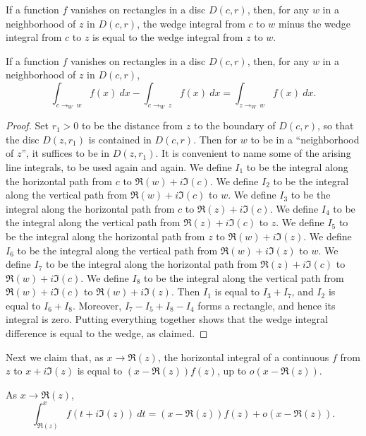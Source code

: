 If a function $f$ vanishes on rectangles in a disc $D(c,r)$, then, for any $w$ in a neighborhood
of $z$ in $D(c,r)$, the wedge integral from $c$ to $w$ minus the wedge integral from $c$ to $z$
is equal to the wedge integral from $z$ to $w$.
\begin{lemma}
  \label{diff_of_wedges}
  \leanok
  If a function $f$ vanishes on rectangles in a disc $D(c,r)$, then, for any $w$ in a
  neighborhood of $z$ in $D(c,r)$,
  $$
    \int_{c\to_W\  w} f(x)\ dx
    -
    \int_{c\to_W\  z} f(x)\ dx
    =
    \int_{z\to_W\  w} f(x)\ dx
    .
  $$
\end{lemma}

 \begin{proof}
 Set $r_1>0$ to be the distance from $z$ to the boundary of $D(c,r)$,
 so that the disc $D(z,r_1)$ is contained in $D(c,r)$.
 Then for $w$ to be in a ``neighborhood of $z$'', it suffices to be in $D(z,r_1)$.
 It is convenient to name some of the arising line integrals, to be used again and again.
 We define $I_1$ to be the integral along the horizontal path from $c$ to $\Re(w)+i\Im(c)$.
 We define $I_2$ to be the integral along the vertical path from $\Re(w)+i\Im(c)$ to $w$.
 We define $I_3$ to be the integral along the horizontal path from $c$ to $\Re(z)+i\Im(c)$.
 We define $I_4$ to be the integral along the vertical path from $\Re(z)+i\Im(c)$ to $z$.
 We define $I_5$ to be the integral along the horizontal path from $z$ to $\Re(w)+i\Im(z)$.
 We define $I_6$ to be the integral along the vertical path from $\Re(w)+i\Im(z)$ to $w$.
 We define $I_7$ to be the integral along the horizontal path from $\Re(z)+i\Im(c)$ to
 $\Re(w)+i\Im(c)$.
 We define $I_8$ to be the integral along the vertical path from $\Re(w)+i\Im(c)$ to
 $\Re(w)+i\Im(z)$.
 Then $I_1$ is equal to $I_3+I_7$,
 and $I_2$ is equal to $I_6+I_8$.
 Moreover, $I_7 - I_5 + I_8 - I_4$ forms a rectangle, and hence its integral is zero.
 Putting everything together shows that the wedge integral difference is equal to the wedge,
 as claimed.
 \end{proof}

Next we claim that, as $x \to \Re(z)$, the horizontal integral of a continuous $f$
from $z$ to $x + i\Im(z)$ is equal to $(x - \Re(z)) f(z)$, up to $o(x - \Re(z))$.
\begin{lemma}
  \label{deriv_of_wedgeInt_re'}
  \leanok
  As $x \to \Re(z)$,
  $$
    \int_{\Re(z)}^x f(t + i\Im(z))\ dt
    =
    (x-\Re(z)) f(z)
    +
    o(x-\Re(z))
    .
  $$
\end{lemma}

